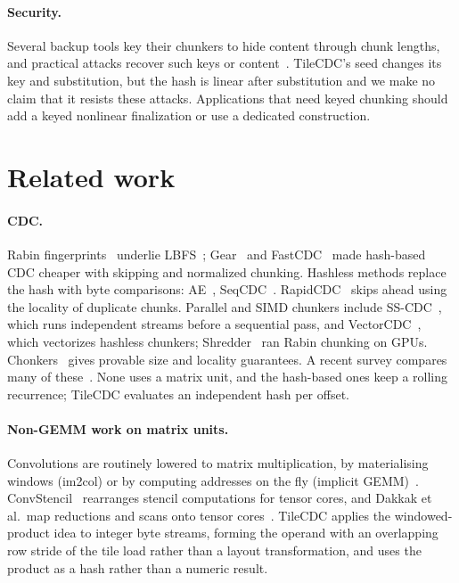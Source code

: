 \documentclass[10pt,twocolumn]{article}
\begin{document}
\paragraph{Security.} Several backup tools key their chunkers to hide content through chunk lengths, and practical attacks recover such keys or content~\cite{cdcattack,alexeev}. TileCDC's seed changes its key and substitution, but the hash is linear after substitution and we make no claim that it resists these attacks. Applications that need keyed chunking should add a keyed nonlinear finalization or use a dedicated construction.

\section{Related work}
\paragraph{CDC.} Rabin fingerprints~\cite{rabin} underlie LBFS~\cite{lbfs}; Gear~\cite{ddelta} and FastCDC~\cite{fastcdc16,fastcdc20} made hash-based CDC cheaper with skipping and normalized chunking. Hashless methods replace the hash with byte comparisons: AE~\cite{ae}, SeqCDC~\cite{seqcdc}. RapidCDC~\cite{rapidcdc} skips ahead using the locality of duplicate chunks. Parallel and SIMD chunkers include SS-CDC~\cite{sscdc}, which runs independent streams before a sequential pass, and VectorCDC~\cite{vectorcdc,vectorcdcx}, which vectorizes hashless chunkers; Shredder~\cite{shredder} ran Rabin chunking on GPUs. Chonkers~\cite{chonkers} gives provable size and locality guarantees. A recent survey compares many of these~\cite{cdcsurvey}. None uses a matrix unit, and the hash-based ones keep a rolling recurrence; TileCDC evaluates an independent hash per offset.

\paragraph{Non-GEMM work on matrix units.} Convolutions are routinely lowered to matrix multiplication, by materialising windows (im2col) or by computing addresses on the fly (implicit GEMM)~\cite{cudnn}. ConvStencil~\cite{convstencil} rearranges stencil computations for tensor cores, and Dakkak et al.\ map reductions and scans onto tensor cores~\cite{dakkak}. TileCDC applies the windowed-product idea to integer byte streams, forming the operand with an overlapping row stride of the tile load rather than a layout transformation, and uses the product as a hash rather than a numeric result.
\end{document}
